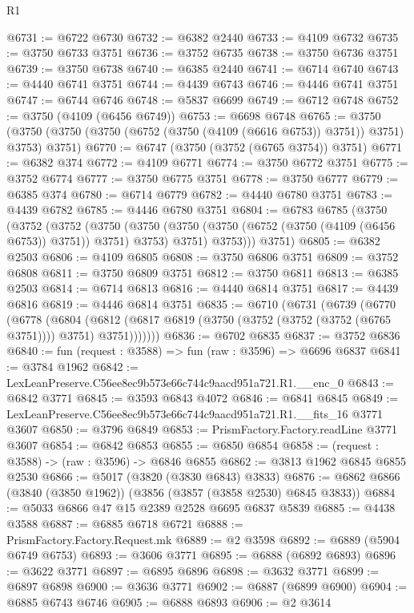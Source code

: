 \begin{lexlean}{R1}
\begin{coremodule}
@6731 := @6722 @6730
@6732 := @6382 @2440
@6733 := @4109 @6732
@6735 := @3750 @6733 @3751
@6736 := @3752 @6735
@6738 := @3750 @6736 @3751
@6739 := @3750 @6738
@6740 := @6385 @2440
@6741 := @6714 @6740
@6743 := @4440 @6741 @3751
@6744 := @4439 @6743
@6746 := @4446 @6741 @3751
@6747 := @6744 @6746
@6748 := @5837 @6699
@6749 := @6712 @6748
@6752 := @3750 (@4109 (@6456 @6749))
@6753 := @6698 @6748
@6765 := @3750 (@3750 (@3750 (@3750 (@6752 (@3750 (@4109 (@6616 @6753)) @3751)) @3751) @3753) @3751)
@6770 := @6747 (@3750 (@3752 (@6765 @3754)) @3751)
@6771 := @6382 @374
@6772 := @4109 @6771
@6774 := @3750 @6772 @3751
@6775 := @3752 @6774
@6777 := @3750 @6775 @3751
@6778 := @3750 @6777
@6779 := @6385 @374
@6780 := @6714 @6779
@6782 := @4440 @6780 @3751
@6783 := @4439 @6782
@6785 := @4446 @6780 @3751
@6804 := @6783
    @6785
    (@3750
      (@3752
        (@3752
          (@3750
            (@3750 (@3750 (@3750 (@6752 (@3750 (@4109 (@6456 @6753)) @3751)) @3751) @3753) @3751)
            @3753)))
      @3751)
@6805 := @6382 @2503
@6806 := @4109 @6805
@6808 := @3750 @6806 @3751
@6809 := @3752 @6808
@6811 := @3750 @6809 @3751
@6812 := @3750 @6811
@6813 := @6385 @2503
@6814 := @6714 @6813
@6816 := @4440 @6814 @3751
@6817 := @4439 @6816
@6819 := @4446 @6814 @3751
@6835 := @6710
    (@6731
      (@6739
        (@6770
          (@6778
            (@6804
              (@6812 (@6817 @6819 (@3750 (@3752 (@3752 (@3752 (@6765 @3751)))) @3751) @3751)))))))
@6836 := @6702 @6835
@6837 := @3752 @6836
@6840 := fun (request : @3588) => fun (raw : @3596) => @6696 @6837
@6841 := @3784 @1962
@6842 := LexLeanPreserve.C56ee8ec9b573e66c744c9aacd951a721.R1.__enc_0
@6843 := @6842 @3771
@6845 := @3593 @6843 @4072
@6846 := @6841 @6845
@6849 := LexLeanPreserve.C56ee8ec9b573e66c744c9aacd951a721.R1.__fits_16 @3771 @3607
@6850 := @3796 @6849
@6853 := PrismFactory.Factory.readLine @3771 @3607
@6854 := @6842 @6853
@6855 := @6850 @6854
@6858 := (request : @3588) -> (raw : @3596) -> @6846 @6855
@6862 := @3813 @1962 @6845 @6855 @2530
@6866 := @5017 (@3820 (@3830 @6843) @3833)
@6876 := @6862 @6866 (@3840 (@3850 @1962)) (@3856 (@3857 (@3858 @2530) @6845 @3833))
@6884 := @5033 @6866 @47 @15 @2389 @2528 @6695 @6837 @5839
@6885 := @4438 @3588
@6887 := @6885 @6718 @6721
@6888 := PrismFactory.Factory.Request.mk
@6889 := @2 @3598
@6892 := @6889 (@5904 @6749 @6753)
@6893 := @3606 @3771
@6895 := @6888 (@6892 @6893)
@6896 := @3622 @3771
@6897 := @6895 @6896
@6898 := @3632 @3771
@6899 := @6897 @6898
@6900 := @3636 @3771
@6902 := @6887 (@6899 @6900)
@6904 := @6885 @6743 @6746
@6905 := @6888 @6893
@6906 := @2 @3614

\end{coremodule}
\end{lexlean}
